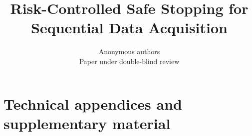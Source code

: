 \documentclass{article} %
\title{Risk-Controlled Safe Stopping for Sequential Data Acquisition}
\author{Anonymous authors\\Paper under double-blind review}
\begin{document}
  
\maketitle














\appendix
\newpage
\section{Technical appendices and supplementary material}


\end{document}
